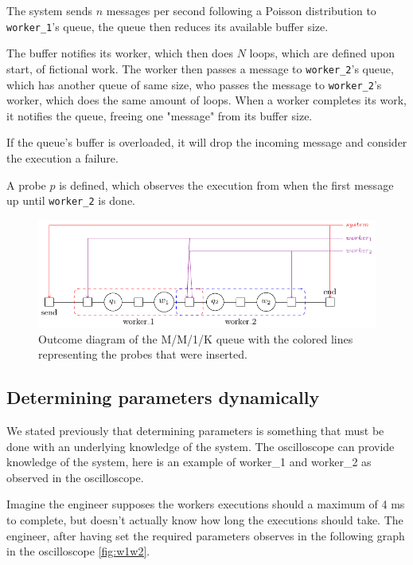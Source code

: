     The system sends $n$ messages per second following a Poisson distribution to \texttt{worker\_1}'s queue, the queue then reduces its available buffer size.
    
    The buffer notifies its worker, which then does $N$ loops, which are defined upon start, of fictional work. The worker then passes a message to \texttt{worker\_2}'s queue, which has another queue of same size, who passes the message to \texttt{worker\_2}'s worker, which does the same amount of loops. When a worker completes its work, it notifies the queue, freeing one "message" from its buffer size.
    
    If the queue's buffer is overloaded, it will drop the incoming message and consider the execution a failure.
    
    A probe $p$ is defined, which observes the execution from when the first message up until \texttt{worker\_2} is done.
    \begin{figure}[H]
        \begin{center}
            \includegraphics[scale=1.2, width=\textwidth]{tikz/mm1k.pdf} 
        \end{center}
        \caption{Outcome diagram of the M/M/1/K queue with the colored lines representing the probes that were inserted.}
        \label{fig:mm1k}
    \end{figure}

    \subsection{Determining parameters dynamically}
        We stated previously that determining parameters is something that must be done with an underlying knowledge of the system. The oscilloscope can provide knowledge of the system, here is an example of worker\_1 and worker\_2 as observed in the oscilloscope.

        Imagine the engineer supposes the workers executions should a maximum of 4 ms to complete, but doesn't actually know how long the executions should take. The engineer, after having set the required parameters observes in the following graph in the oscilloscope \cref{fig:w1w2}.

